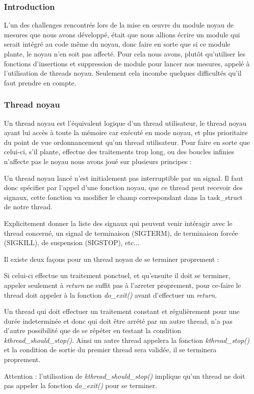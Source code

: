 					\subsubsection{Introduction}
						L'un des challenges rencontrés lors de la mise en \oe uvre du module noyau de mesures que nous avons développé, était que nous allions écrire un module qui serait intégré au code même du noyau, donc faire en sorte que si ce module plante, le noyau n'en soit pas affecté. Pour cela nous avons, plutôt qu'utiliser les fonctions d'insertions et suppression de module pour lancer nos mesures, appelé à l'utilisation de threads noyau. Seulement cela incombe quelques difficultés qu'il faut prendre en compte.
					\subsubsection{Thread noyau}
						Un thread noyau est l'équivalent logique d'un thread utilisateur, le thread noyau ayant lui accès à toute la mémoire car exécuté en mode noyau, et plus prioritaire du point de vue ordonnancement qu'un thread utilisateur. Pour faire en sorte que celui-ci, s'il plante, effectue des traitements trop long, ou des boucles infinies n'affecte pas le noyau nous avons joué sur plusieurs principes : 
						\bitem
							\item{Un thread noyau lancé n'est initialement pas interruptible par un signal. Il faut donc spécifier par l'appel d'une fonction noyau, que ce thread peut recevoir des signaux, cette fonction va modifier le champ correspondant dans la task\_struct de notre thread.}
							\item{Explicitement donner la liste des signaux qui peuvent venir intéragir avec le thread concerné, un signal de terminaison (SIGTERM), de terminaison forcée (SIGKILL), de suspension (SIGSTOP), etc...}
							\item{Il existe deux façons pour un thread noyau de se terminer proprement :
								\bitem
									\item{Si celui-ci effectue un traitement ponctuel, et qu'ensuite il doit se terminer, appeler seulement à \emph{return} ne suffit pas à l'arreter proprement, pour ce-faire le thread doit appeler à la fonction \emph{do\_exit()} avant d'effectuer un \emph{return}.}
									\item{Un thread qui doit effectuer un traitement constant et régulièrement pour une durée indeterminée et donc qui doit être arrété par un autre thread, n'a pas d'autre possibilité que de se répéter en testant la condition \emph{kthread\_should\_stop()}. Ainsi un autre thread appelera la fonction \emph{kthread\_stop()} et la condition de sortie du premier thread sera validée, il se terminera proprement.}
									\item{Attention : l'utilisation de \emph{kthread\_should\_stop()} implique qu'un thread ne doit pas appeler la fonction \emph{do\_exit()} pour se terminer.}
								\eitem 
							}
